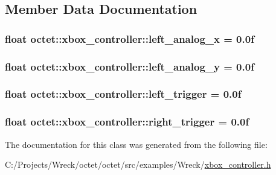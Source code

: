 \subsection{Member Data Documentation}
\hypertarget{classoctet_1_1xbox__controller_a4155ad43e820b46bdc1d4bced4d232ab}{
\subsubsection[{left\+\_\+analog\+\_\+x}]{\setlength{\rightskip}{0pt plus 5cm}float octet\+::xbox\+\_\+controller\+::left\+\_\+analog\+\_\+x = 0.\+0f}}\label{classoctet_1_1xbox__controller_a4155ad43e820b46bdc1d4bced4d232ab}
\hypertarget{classoctet_1_1xbox__controller_aaa5d7e08fd31b573ad296357619284d3}{
\subsubsection[{left\+\_\+analog\+\_\+y}]{\setlength{\rightskip}{0pt plus 5cm}float octet\+::xbox\+\_\+controller\+::left\+\_\+analog\+\_\+y = 0.\+0f}}\label{classoctet_1_1xbox__controller_aaa5d7e08fd31b573ad296357619284d3}
\hypertarget{classoctet_1_1xbox__controller_a1860e2290b33fa35c7b57f6ceaa78881}{
\subsubsection[{left\+\_\+trigger}]{\setlength{\rightskip}{0pt plus 5cm}float octet\+::xbox\+\_\+controller\+::left\+\_\+trigger = 0.\+0f}}\label{classoctet_1_1xbox__controller_a1860e2290b33fa35c7b57f6ceaa78881}
\hypertarget{classoctet_1_1xbox__controller_a8406f69ac00c5ee2107e2fbea7980cd3}{
\subsubsection[{right\+\_\+trigger}]{\setlength{\rightskip}{0pt plus 5cm}float octet\+::xbox\+\_\+controller\+::right\+\_\+trigger = 0.\+0f}}\label{classoctet_1_1xbox__controller_a8406f69ac00c5ee2107e2fbea7980cd3}


The documentation for this class was generated from the following file\+:\begin{DoxyCompactItemize}
\item 
C\+:/\+Projects/\+Wreck/octet/octet/src/examples/\+Wreck/\hyperlink{xbox__controller_8h}{xbox\+\_\+controller.\+h}\end{DoxyCompactItemize}
